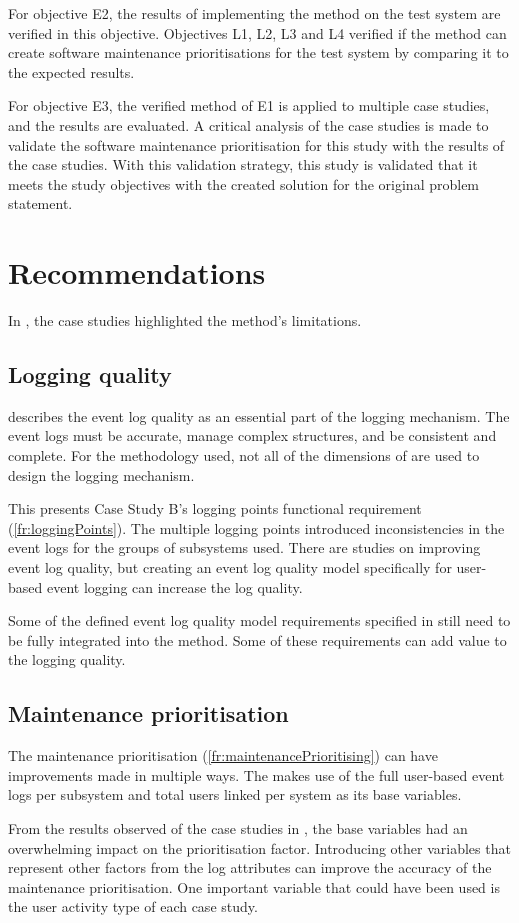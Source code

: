 For objective E2, the results of implementing the method on the test system are verified in this objective. Objectives L1, L2, L3 and L4 verified if the method can create software maintenance prioritisations for the test system by comparing it to the expected results. \par For objective E3, the verified method of E1 is applied to multiple case studies, and the results are evaluated. A critical analysis of the case studies is made to validate the software maintenance prioritisation for this study with the results of the case studies. With this validation strategy, this study is validated that it meets the study objectives with the created solution for the original problem statement.

\section{Recommendations}
In , the case studies highlighted the method's limitations. 

\subsection{Logging quality}
 describes the event log quality as an essential part of the logging mechanism. The event logs must be accurate, manage complex structures, and be consistent and complete. For the methodology used, not all of the dimensions of  are used to design the logging mechanism.\par This presents Case Study B's logging points functional requirement (\ref{fr:loggingPoints}). The multiple logging points introduced inconsistencies in the event logs for the groups of subsystems used. There are studies on improving event log quality, but creating an event log quality model specifically for user-based event logging can increase the log quality. \par Some of the defined event log quality model requirements specified in  still need to be fully integrated into the method. Some of these requirements can add value to the logging quality.

\subsection{Maintenance prioritisation}
The maintenance prioritisation (\ref{fr:maintenancePrioritising}) can have improvements made in multiple ways. The  makes use of the full user-based event logs per subsystem and total users linked per system as its base variables.\par From the results observed of the case studies in , the base variables had an overwhelming impact on the prioritisation factor. Introducing other variables that represent other factors from the log attributes can improve the accuracy of the maintenance prioritisation. One important variable that could have been used is the user activity type of each case study.


